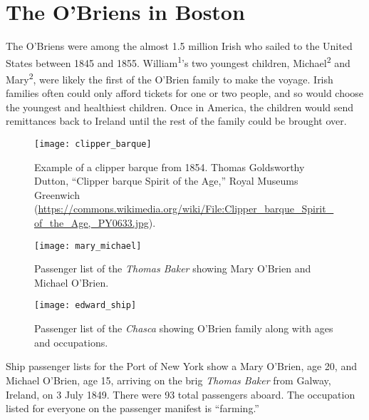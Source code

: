 \chapter{The O'Briens in Boston}

The O'Briens were among the almost 1.5 million Irish who sailed to the United States between 1845 and 1855.\cite{Miller:291} William\textsuperscript{1}'s two youngest children, Michael\textsuperscript{2} and Mary\textsuperscript{2}, were likely the first of the O'Brien family to make the voyage. Irish families often could only afford tickets for one or two people, and so would choose the youngest and healthiest children.\cite{Miller:292} Once in America, the children would send remittances back to Ireland until the rest of the family could be brought over.\cite{Miller:295}

\begin{figure}
	\centering
	\texttt{[image: clipper\_barque]}
	\caption{Example of a clipper barque from 1854. Thomas Goldsworthy Dutton, ``Clipper barque Spirit of the Age,'' Royal Museums Greenwich (\url{https://commons.wikimedia.org/wiki/File:Clipper_barque_Spirit_of_the_Age,_PY0633.jpg}).}
\end{figure}

\begin{figure}
	\centering
	\texttt{[image: mary\_michael]}
	\caption{Passenger list of the \textit{Thomas Baker} showing Mary O'Brien and Michael O'Brien.\cite{ThomasBaker}}
\end{figure}

\begin{figure}
	\centering
	\texttt{[image: edward\_ship]}
	\caption{Passenger list of the \textit{Chasca} showing O'Brien family along with ages and occupations.\cite{Chascay}}
\end{figure}

Ship passenger lists for the Port of New York show a Mary O'Brien, age 20, and Michael O'Brien, age 15, arriving on the brig \textit{Thomas Baker} from Galway, Ireland, on 3 July 1849. There were 93 total passengers aboard. The occupation listed for everyone on the passenger manifest is ``farming.''\cite{ThomasBaker}


